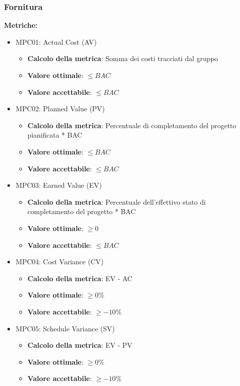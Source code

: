 \documentclass[12pt]{article}
\begin{document}
\subsubsection{Fornitura}
\textbf{Metriche:}
\begin{itemize}
	\item MPC01: Actual Cost (AV)
	      \begin{itemize}
		      \item \textbf{Calcolo della metrica}: Somma dei costi tracciati dal gruppo
		      \item \textbf{Valore ottimale}: $\le BAC$
		      \item \textbf{Valore accettabile}: $\le BAC$
	      \end{itemize}
	\item MPC02: Planned Value (PV)
	      \begin{itemize}
		      \item \textbf{Calcolo della metrica}: Percentuale di completamento del progetto pianificata * BAC
		      \item \textbf{Valore ottimale}: $\le BAC$
		      \item \textbf{Valore accettabile}: $\le BAC$
	      \end{itemize}
	\item MPC03: Earned Value (EV)
	      \begin{itemize}
		      \item \textbf{Calcolo della metrica}: Percentuale dell'effettivo stato di completamento del progetto * BAC
		      \item \textbf{Valore ottimale}: $\ge 0$
		      \item \textbf{Valore accettabile}: $\le BAC$
	      \end{itemize}
	\item MPC04: Cost Variance (CV)
	      \begin{itemize}
		      \item \textbf{Calcolo della metrica}:  EV - AC
		      \item \textbf{Valore ottimale}: $\ge 0\%$
		      \item \textbf{Valore accettabile}: $\ge -10\%$
	      \end{itemize}
	\item MPC05: Schedule Variance (SV)
	      \begin{itemize}
		      \item \textbf{Calcolo della metrica}:  EV - PV
		      \item \textbf{Valore ottimale}: $\ge 0\%$
		      \item \textbf{Valore accettabile}: $\ge -10\%$
	      \end{itemize}


\end{itemize}
\end{document}
